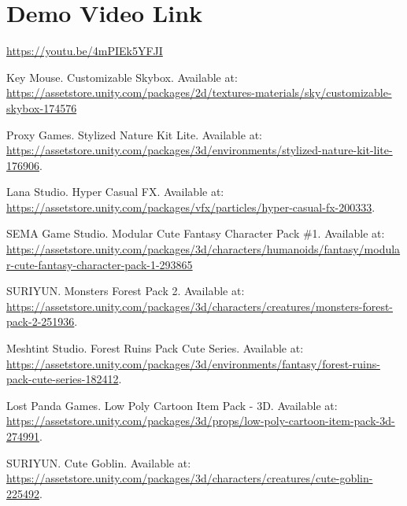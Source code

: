 \documentclass[10pt]{final_report}
\begin{document}
\section{Demo Video Link}
\url{https://youtu.be/4mPIEk5YFJI}

\newpage

\raggedright


\renewcommand{\bibname}{Assets Used}
\begin{thebibliography}{99}

 Key Mouse. Customizable Skybox. Available at: \url{https://assetstore.unity.com/packages/2d/textures-materials/sky/customizable-skybox-174576}

 Proxy Games. Stylized Nature Kit Lite. Available at: \url{https://assetstore.unity.com/packages/3d/environments/stylized-nature-kit-lite-176906}. 

 Lana Studio. Hyper Casual FX. Available at: \url{https://assetstore.unity.com/packages/vfx/particles/hyper-casual-fx-200333}.

 SEMA Game Studio. Modular Cute Fantasy Character Pack \#1. Available at: \url{https://assetstore.unity.com/packages/3d/characters/humanoids/fantasy/modular-cute-fantasy-character-pack-1-293865}

 SURIYUN. Monsters Forest Pack 2. Available at: \url{https://assetstore.unity.com/packages/3d/characters/creatures/monsters-forest-pack-2-251936}. 

 Meshtint Studio. Forest Ruins Pack Cute Series. Available at: \url{https://assetstore.unity.com/packages/3d/environments/fantasy/forest-ruins-pack-cute-series-182412}. 

 Lost Panda Games. Low Poly Cartoon Item Pack - 3D. Available at: \url{https://assetstore.unity.com/packages/3d/props/low-poly-cartoon-item-pack-3d-274991}. 

 SURIYUN. Cute Goblin. Available at: \url{https://assetstore.unity.com/packages/3d/characters/creatures/cute-goblin-225492}. 

\end{thebibliography}

\label{endpage}
\end{document}
